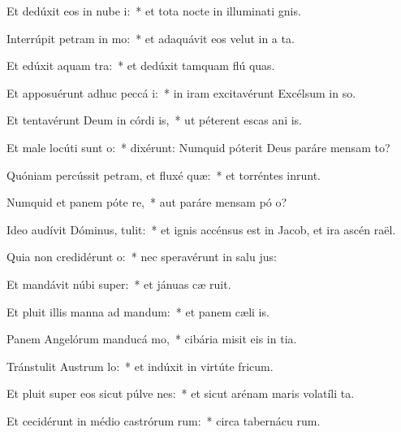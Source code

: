 \item Et dedúxit eos in nube i:~* et tota nocte in illuminati gnis.
\item Interrúpit petram in mo:~* et adaquávit eos velut in a ta.
\item Et edúxit aquam  tra:~* et dedúxit tamquam flú quas.
\item Et apposuérunt adhuc peccá i:~* in iram excitavérunt Excélsum in so.
\item Et tentavérunt Deum in córdi is,~* ut péterent escas ani is.
\item Et male locúti sunt  o:~* dixérunt: Numquid póterit Deus paráre mensam  to?
\item Quóniam percússit petram, et fluxé quæ:~* et torréntes inrunt.
\item Numquid et panem póte re,~* aut paráre mensam pó o?
\item Ideo audívit Dóminus,  tulit:~* et ignis accénsus est in Jacob, et ira ascén  raël.
\item Quia non credidérunt  o:~* nec speravérunt in salu jus:
\item Et mandávit núbi super:~* et jánuas cæ ruit.
\item Et pluit illis manna ad mandum:~* et panem cæli  is.
\item Panem Angelórum manducá mo,~* cibária misit eis in tia.
\item Tránstulit Austrum  lo:~* et indúxit in virtúte  fricum.
\item Et pluit super eos sicut púlve nes:~* et sicut arénam maris volatíli ta.
\item Et cecidérunt in médio castrórum rum:~* circa tabernácu rum.
